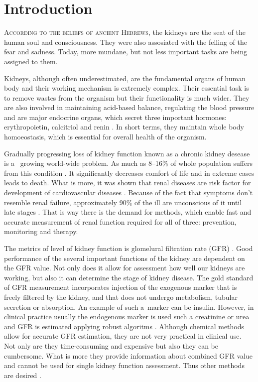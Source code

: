 	\setcounter{page}{1}
	
\chapter*{Introduction}



\lettrine[lines=3, slope=1em, findent=-0.8em]{A}{ccording to the beliefs of ancient Hebrews}, the kidneys are the seat of the human soul and consciousness. They were also assosiated with the felling of the fear and sadness\cite{maio1999metaphorical}. Today, more mundane, but not less important tasks are being assigned to them. 

Kidneys, although often underestimated, are the fundamental organs of human body and their working mechanism is extremely complex. Their essential task is to remove wastes from the organism but their functionality is much wider. They are also involved in maintaining acid-based balance, regulating the blood pressure and are major endocrine organs, which secret three important hormones: erythropoietin, calcitriol and renin \cite{saladin}. In short terms, they maintain whole body homoeostasis, which is essential for overall health of the organism. 

Gradually progressing loss of kidney function known as a chronic kidney desease is a~ growing world-wide problem. As much as 8--16\% of whole population suffers from this condition \cite{statistics}. It significantly decreases comfort of life and in extreme cases leads to death. What is more, it was shown that renal diseases are risk factor for development of cardiovascular diseases \cite{cardiovascular_diseases}.
Because of the fact that symptoms don't resemble renal failure, approximately 90\% of the ill are unconscious of it until late stages \cite{national_kidney_foundation}. That is way there is the demand for methods, which enable fast and accurate measurement of renal function required for all of three: prevention, monitoring and therapy.

The metrics of level of kidney function is glomelural filtration rate (GFR) \cite{traynor2006measure}. Good performance of the several important functions of the kidney are dependent on the GFR value. Not only does it allow for assessment how well our kidneys are working, but also it can determine the stage of kidney disease.
The gold standard of GFR measurement incorporates injection of the exogenous marker that is freely filtered by the kidney, and that does not undergo metabolism, tubular secretion or absorption. An example of such a~marker can be insulin.
However, in clinical practice usually the endogenous marker is used such a creatinine or urea and GFR is estimated applying robust algoritms \cite{delanaye2012measuring}.
Although chemical methods allow for accurate GFR estimation, they are not very practical in clinical use. Not only are they time-consuming and expensive but also they can be cumbersome. What is more they provide information about combined GFR value and cannot be used for single kidney function assessment. Thus other methods are desired \cite{bokacheva2008assessment}.

